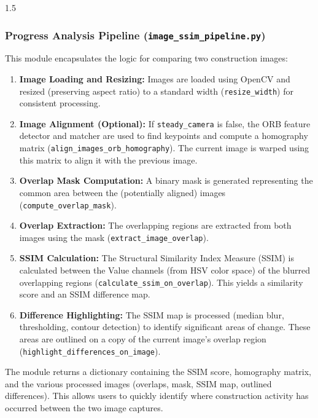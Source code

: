 \documentclass[12pt,a4paper]{report}
\begin{document}
\begin{spacing}{1.5}
    \subsubsection{Progress Analysis Pipeline (\texttt{image\_ssim\_pipeline.py})}
    This module encapsulates the logic for comparing two construction images:
    \begin{enumerate}
        \item \textbf{Image Loading and Resizing:} Images are loaded using OpenCV and resized (preserving aspect ratio) to a standard width (\texttt{resize\_width}) for consistent processing.
        \item \textbf{Image Alignment (Optional):} If \texttt{steady\_camera} is false, the ORB feature detector and matcher are used to find keypoints and compute a homography matrix (\texttt{align\_images\_orb\_homography}). The current image is warped using this matrix to align it with the previous image.
        \item \textbf{Overlap Mask Computation:} A binary mask is generated representing the common area between the (potentially aligned) images (\texttt{compute\_overlap\_mask}).
        \item \textbf{Overlap Extraction:} The overlapping regions are extracted from both images using the mask (\texttt{extract\_image\_overlap}).
        \item \textbf{SSIM Calculation:} The Structural Similarity Index Measure (SSIM) is calculated between the Value channels (from HSV color space) of the blurred overlapping regions (\texttt{calculate\_ssim\_on\_overlap}). This yields a similarity score and an SSIM difference map.
        \item \textbf{Difference Highlighting:} The SSIM map is processed (median blur, thresholding, contour detection) to identify significant areas of change. These areas are outlined on a copy of the current image's overlap region (\texttt{highlight\_differences\_on\_image}).
    \end{enumerate}
    The module returns a dictionary containing the SSIM score, homography matrix, and the various processed images (overlaps, mask, SSIM map, outlined differences). This allows users to quickly identify where construction activity has occurred between the two image captures.


\end{spacing}
\end{document}
